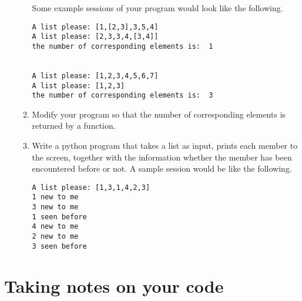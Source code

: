 \documentclass[a4paper]{article}
\begin{document}
\begin{itemize}
\begin{uexercise}
\begin{enumerate}
Some example sessions of your program
would look like the following.

\begin{ucodeframe}
\begin{Verbatim}
A list please: [1,[2,3],3,5,4]
A list please: [2,3,3,4,[3,4]]
the number of corresponding elements is:  1


A list please: [1,2,3,4,5,6,7]
A list please: [1,2,3]
the number of corresponding elements is:  3
\end{Verbatim}
\end{ucodeframe}

\item

Modify your program so that the number of corresponding elements is returned by a function. 

\item

Write a python program that takes a list as input, prints each member to the
screen, together with the information whether the member has been encountered
before or not. A sample session would be like the following.


\begin{ucodeframe}
\begin{Verbatim}
A list please: [1,3,1,4,2,3]
1 new to me
3 new to me
1 seen before
4 new to me
2 new to me
3 seen before
\end{Verbatim}
\end{ucodeframe}
\end{enumerate}
\end{uexercise}

\end{itemize}



\section{Taking notes on your code}
\end{document}
